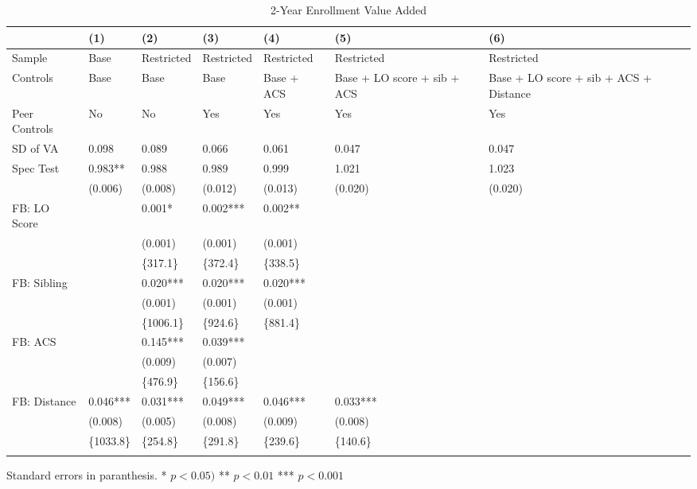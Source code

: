 \begin{table}[tbp] \centering
{}

\caption{2-Year Enrollment Value Added}
{\footnotesize
\begin{tabularx}{\linewidth}{lCCCCCC}

\toprule
&{(1)}&{(2)}&{(3)}&{(4)}&{(5)}&{(6)} \tabularnewline
\midrule \addlinespace[\belowrulesep]
Sample&Base&Restricted&Restricted&Restricted&Restricted&Restricted \tabularnewline
Controls&Base&Base&Base&Base + ACS&Base + LO score + sib + ACS&Base + LO score + sib + ACS + Distance \tabularnewline
Peer Controls&No&No&Yes&Yes&Yes&Yes \tabularnewline
\midrule SD of VA&0.098&0.089&0.066&0.061&0.047&0.047 \tabularnewline
Spec Test&0.983**&0.988&0.989&0.999&1.021&1.023 \tabularnewline
&(0.006)&(0.008)&(0.012)&(0.013)&(0.020)&(0.020) \tabularnewline
FB: LO Score&&0.001*&0.002***&0.002**&& \tabularnewline
&&(0.001)&(0.001)&(0.001)&& \tabularnewline
&&\{317.1\}&\{372.4\}&\{338.5\}&& \tabularnewline
FB: Sibling&&0.020***&0.020***&0.020***&& \tabularnewline
&&(0.001)&(0.001)&(0.001)&& \tabularnewline
&&\{1006.1\}&\{924.6\}&\{881.4\}&& \tabularnewline
FB: ACS&&0.145***&0.039***&&& \tabularnewline
&&(0.009)&(0.007)&&& \tabularnewline
&&\{476.9\}&\{156.6\}&&& \tabularnewline
FB: Distance&0.046***&0.031***&0.049***&0.046***&0.033***& \tabularnewline
&(0.008)&(0.005)&(0.008)&(0.009)&(0.008)& \tabularnewline
&\{1033.8\}&\{254.8\}&\{291.8\}&\{239.6\}&\{140.6\}& \tabularnewline
\bottomrule \addlinespace[\belowrulesep]

\end{tabularx}
\begin{flushleft}
\footnotesize Standard errors in paranthesis. * \(p<0.05)\) ** \(p<0.01\) *** \(p<0.001\)
\end{flushleft}
}
\end{table}

